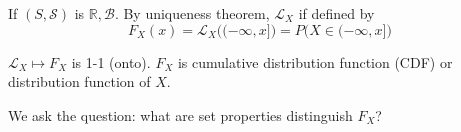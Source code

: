 If $ (S, \mathcal{S})$ is $\mathbb{R}, \mathcal{B}$. By uniqueness theorem, $\mathcal{L}_X$ if defined by
$$F_X(x) = \mathcal{L}_X\big((-\infty, x]\big) = P\big(X\in (-\infty, x]\big)$$ 

$\mathcal{L}_X \mapsto F_X$ is 1-1 (onto). $F_X$ is cumulative distribution function (CDF) or distribution function of $X$.

We ask the question: what are set properties distinguish $F_X$? 
